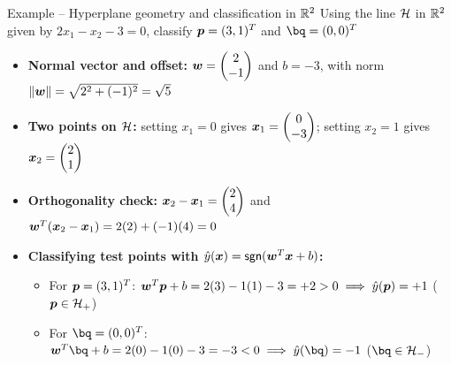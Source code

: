 \documentclass[aspectratio=169]{beamer}\usepackage[]{graphicx}\usepackage[]{xcolor}
\begin{document}
\begin{frame}{Example -- Hyperplane geometry and classification in $\mathbb{R}^2$}
    Using the line $\mathcal{H}$ in $\mathbb{R}^2$ given by $2x_1 - x_2 - 3 = 0$, classify $\bm{p} = (3, 1)^T$ and $\bq = (0, 0)^T$
    \vfill
    \begin{itemize}
        \item \textbf{Normal vector and offset:} $\bm{w} = \begin{pmatrix} 2 \\ -1 \end{pmatrix}$ and $b = -3$, with norm $\|\bm{w}\| = \sqrt{2^2 + (-1)^2} = \sqrt{5}$
        \vfill
        \item \textbf{Two points on $\mathcal{H}$:} setting $x_1 = 0$ gives $\bm{x}_1 = \begin{pmatrix} 0 \\ -3 \end{pmatrix}$; setting $x_2 = 1$ gives $\bm{x}_2 = \begin{pmatrix} 2 \\ 1 \end{pmatrix}$
        \vfill
        \item \textbf{Orthogonality check:} $\bm{x}_2 - \bm{x}_1 = \begin{pmatrix} 2 \\ 4 \end{pmatrix}$ and $\bm{w}^T(\bm{x}_2 - \bm{x}_1) = 2(2) + (-1)(4) = 0$
        \vfill
        \item \textbf{Classifying test points with $\hat{y}(\bm{x}) = \mathsf{sgn}(\bm{w}^T \bm{x} + b)$:}
        \begin{itemize}
            \item For $\bm{p} = (3, 1)^T$: $\bm{w}^T \bm{p} + b = 2(3) - 1(1) - 3 = +2 > 0 \implies \hat{y}(\bm{p}) = +1$ ($\bm{p} \in \mathcal{H}_+$)
            \item For $\bq = (0, 0)^T$: $\bw^T \bq + b = 2(0) - 1(0) - 3 = -3 < 0 \implies \hat{y}(\bq) = -1$ ($\bq \in \H_-$)
        \end{itemize}
    \end{itemize}
\end{frame}


\end{document}
